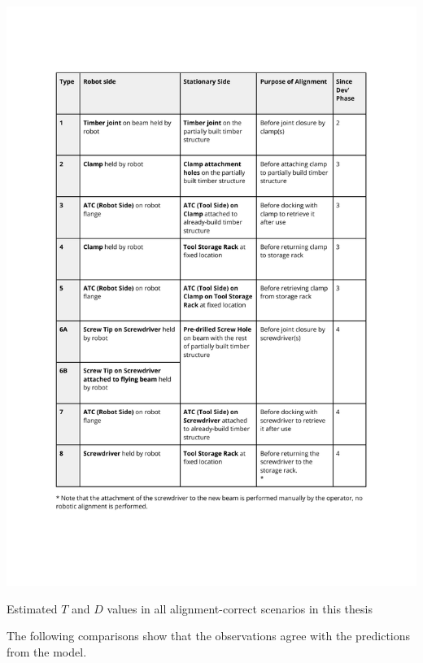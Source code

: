 \begin{table}
    \includegraphics[page=8, trim=25.4mm 100mm 25.4mm 33mm, clip, width=\textwidth]{tables/Tables in Chapter 9 to 11.pdf}
    \caption{Estimated $T$ and $D$ values in all alignment-correct scenarios in this thesis}
    \label{table:t_and_d_values_for_all_alignment}
\end{table}

The following comparisons show that the observations agree with the predictions from the model.

